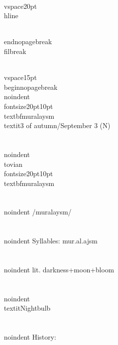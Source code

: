 \\vspace{20pt}\\hline

\\end{nopagebreak}
\\filbreak



\\vspace{15pt}
\\begin{nopagebreak}
\\noindent{\\fontsize{20pt}{10pt}\\textbf{muralaysm} } \\textit{3 of autumn/September 3} (N)\\\\
\\noindent {\\tovian \\fontsize{20pt}{10pt} \\textbf{muralaysm} }\\\\
\\noindent /mur{\textprimstress}alaysm/\\\\
\\noindent Syllables: mur.al.ajsm\\\\
\\noindent lit. darkness+moon+bloom\\\\
\\noindent \\textit{Nightbulb}\\\\


\\noindent History:

